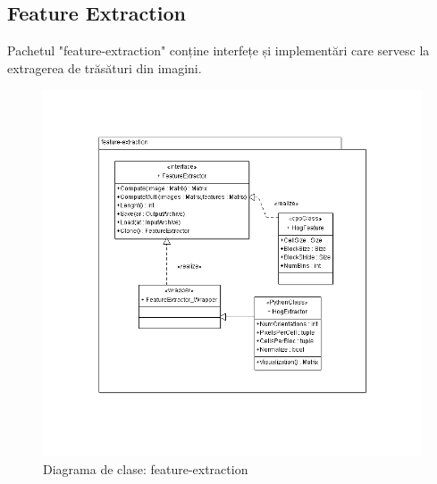 \subsection{Feature Extraction}
Pachetul "feature-extraction" conține interfețe și implementări care servesc la extragerea de trăsături din imagini.
\begin{figure}[h]
	\centering
		\includegraphics[width=1.00\textwidth]{uml/featureextractionClassDiagram.png}
	\caption{Diagrama de clase: feature-extraction}
	\label{fig:featureextractionClassDiagram}
\end{figure}

